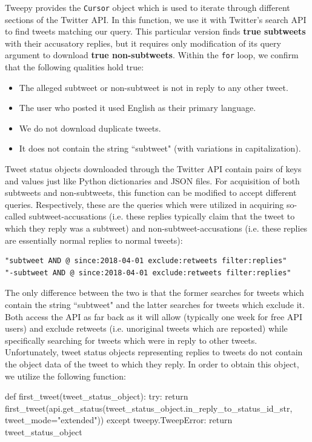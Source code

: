 \documentclass[11pt, twoside, reqno]{book}
\begin{document}
\noindent
Tweepy \cite{tweepy_python} provides the \verb|Cursor| object which is used to iterate through different sections of the Twitter API. In this function, we use it with Twitter's search API to find tweets matching our query. This particular version finds \textbf{true subtweets} with their accusatory replies, but it requires only modification of its query argument to download \textbf{true non-subtweets}. 
\noindent
Within the \verb|for| loop, we confirm that the following qualities hold true:
\begin{itemize}
	\item The alleged subtweet or non-subtweet is not in reply to any other tweet.
	\item The user who posted it used English as their primary language.
	\item We do not download duplicate tweets.
	\item It does not contain the string ``subtweet" (with variations in capitalization).
\end{itemize}
\noindent
Tweet status objects downloaded through the Twitter API contain pairs of keys and values just like Python dictionaries and JSON files. For acquisition of both subtweets and non-subtweets, this function can be modified to accept different queries. Respectively, these are the queries which were utilized in acquiring so-called subtweet-accusations (i.e. these replies typically claim that the tweet to which they reply was a subtweet) and non-subtweet-accusations (i.e. these replies are essentially normal replies to normal tweets):

\begin{verbatim}
"subtweet AND @ since:2018-04-01 exclude:retweets filter:replies"
"-subtweet AND @ since:2018-04-01 exclude:retweets filter:replies"
\end{verbatim}

\noindent
The only difference between the two is that the former searches for tweets which contain the string ``subtweet" and the latter searches for tweets which exclude it. Both access the API as far back as it will allow (typically one week for free API users) and exclude retweets (i.e. unoriginal tweets which are reposted) while specifically searching for tweets which were in reply to other tweets. Unfortunately, tweet status objects representing replies to tweets do not contain the object data of the tweet to which they reply. In order to obtain this object, we utilize the following function:

\begin{python}
def first_tweet(tweet_status_object):
    try:
        return first_tweet(api.get_status(tweet_status_object.in_reply_to_status_id_str, 
                                          tweet_mode="extended"))
    except tweepy.TweepError:
        return tweet_status_object
\end{python}
\end{document}
